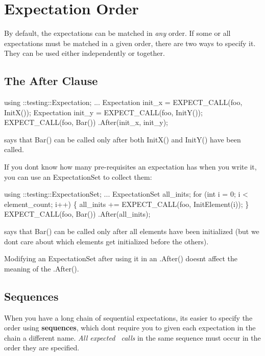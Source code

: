 \section*{Expectation Order}

By default, the expectations can be matched in {\itshape any} order. If some or all expectations must be matched in a given order, there are two ways to specify it. They can be used either independently or together.

\subsection*{The After Clause}


\begin{DoxyCode}
using ::testing::Expectation;
...
Expectation init\_x = EXPECT\_CALL(foo, InitX());
Expectation init\_y = EXPECT\_CALL(foo, InitY());
EXPECT\_CALL(foo, Bar())
    .After(init\_x, init\_y);
\end{DoxyCode}
 says that {\ttfamily Bar()} can be called only after both {\ttfamily Init\+X()} and {\ttfamily Init\+Y()} have been called.

If you don\textquotesingle{}t know how many pre-\/requisites an expectation has when you write it, you can use an {\ttfamily Expectation\+Set} to collect them\+:


\begin{DoxyCode}
using ::testing::ExpectationSet;
...
ExpectationSet all\_inits;
for (int i = 0; i < element\_count; i++) \{
  all\_inits += EXPECT\_CALL(foo, InitElement(i));
\}
EXPECT\_CALL(foo, Bar())
    .After(all\_inits);
\end{DoxyCode}
 says that {\ttfamily Bar()} can be called only after all elements have been initialized (but we don\textquotesingle{}t care about which elements get initialized before the others).

Modifying an {\ttfamily Expectation\+Set} after using it in an {\ttfamily .After()} doesn\textquotesingle{}t affect the meaning of the {\ttfamily .After()}.

\subsection*{Sequences}

When you have a long chain of sequential expectations, it\textquotesingle{}s easier to specify the order using {\bfseries sequences}, which don\textquotesingle{}t require you to given each expectation in the chain a different name. {\itshape All expected~\newline
 calls} in the same sequence must occur in the order they are specified.



